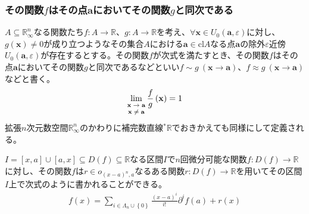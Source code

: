 \documentclass[dvipdfmx]{jsarticle}
\begin{document}
\subsubsection{その関数$f$はその点$\mathbf{a}$においてその関数$g$と同次である}%
\begin{dfn}
$A \subseteq \mathbb{R}_{\infty}^{n}$なる関数たち$f:A \rightarrow \mathbb{R}$、$g:A \rightarrow \mathbb{R}$を考え、$\forall\mathbf{x} \in U_{0}\left( \mathbf{a},\varepsilon \right)$に対し、$g\left( \mathbf{x} \right) \neq 0$が成り立つようなその集合$A$における$\mathbf{a} \in \mathrm{cl}A$なる点$\mathbf{a}$の除外$\varepsilon$近傍$U_{0}\left( \mathbf{a},\varepsilon \right)$が存在するとする。その関数$f$が次式を満たすとき、その関数$f$はその点$\mathbf{a}$においてその関数$g$と同次であるなどといい$f \sim g\ \left( \mathbf{x} \rightarrow \mathbf{a} \right)$、$f \approx g\ \left( \mathbf{x} \rightarrow \mathbf{a} \right)$などと書く。
\begin{align*}
\lim_{\scriptsize \begin{matrix}
\mathbf{x} \rightarrow \mathbf{a} \\
\mathbf{x} \neq \mathbf{a} \\
\end{matrix}}{\frac{f}{g}\left( \mathbf{x} \right)} = 1
\end{align*}
拡張$n$次元数空間$\mathbb{R}_{\infty}^{n}$のかわりに補完数直線${}^{*}\mathbb{R}$でおきかえても同様にして定義される。
\end{dfn}
\begin{thm}\label{4.2.4.3}
$I = [ x,a] \cup [ a,x] \subseteq D(f) \subseteq \mathbb{R}$なる区間$I$で$n$回微分可能な関数$f:D(f) \rightarrow \mathbb{R}$に対し、その関数$f$は$r \in o_{(x - a)^{n},a}$なるある関数$r:D(f) \rightarrow \mathbb{R}$を用いてその区間$I$上で次式のように書かれることができる。
\begin{align*}
f(x) = \sum_{i \in \varLambda_{n} \cup \left\{ 0 \right\}} {\frac{(x - a)^{i}}{i!}\partial^{i}f(a)} + r(x)
\end{align*}
\end{thm}
\end{document}
